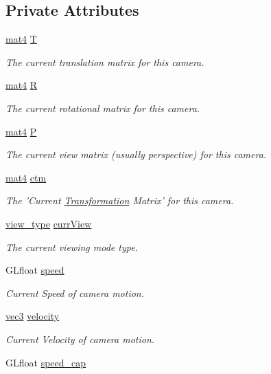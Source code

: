 \subsection*{Private Attributes}
\begin{DoxyCompactItemize}
\item 
\hyperlink{class_angel_1_1mat4}{mat4} \hyperlink{class_camera_aa4cb92b539c9a9707a12d7025ed889f6}{T}
\begin{DoxyCompactList}\small\item\em The current translation matrix for this camera. \end{DoxyCompactList}\item 
\hyperlink{class_angel_1_1mat4}{mat4} \hyperlink{class_camera_a8fd028120b18556c43ad86756e637fbc}{R}
\begin{DoxyCompactList}\small\item\em The current rotational matrix for this camera. \end{DoxyCompactList}\item 
\hyperlink{class_angel_1_1mat4}{mat4} \hyperlink{class_camera_a0bee6fbae6ec5960850a5fb858f3912a}{P}
\begin{DoxyCompactList}\small\item\em The current view matrix (usually perspective) for this camera. \end{DoxyCompactList}\item 
\hyperlink{class_angel_1_1mat4}{mat4} \hyperlink{class_camera_a9b1e81e3f5531390bb6a599dca0d2444}{ctm}
\begin{DoxyCompactList}\small\item\em The 'Current \hyperlink{class_transformation}{Transformation} Matrix' for this camera. \end{DoxyCompactList}\item 
\hyperlink{class_camera_afdccec6d447490dcc80ab6b99f21d0e5}{view\-\_\-type} \hyperlink{class_camera_a1fe2ef68d26bb98f0aa736948304eb64}{curr\-View}
\begin{DoxyCompactList}\small\item\em The current viewing mode type. \end{DoxyCompactList}\item 
G\-Lfloat \hyperlink{class_camera_a308e92b5d3ef0eea5cac7745df6e28f4}{speed}
\begin{DoxyCompactList}\small\item\em Current Speed of camera motion. \end{DoxyCompactList}\item 
\hyperlink{struct_angel_1_1vec3}{vec3} \hyperlink{class_camera_a5b95c890f213db50f321380108b17ea1}{velocity}
\begin{DoxyCompactList}\small\item\em Current Velocity of camera motion. \end{DoxyCompactList}\item 
\hypertarget{class_camera_aa075ae6872228fc4db892533d9f6d881}{G\-Lfloat \hyperlink{class_camera_aa075ae6872228fc4db892533d9f6d881}{speed\-\_\-cap}}\label{class_camera_aa075ae6872228fc4db892533d9f6d881}


\end{DoxyCompactItemize}
